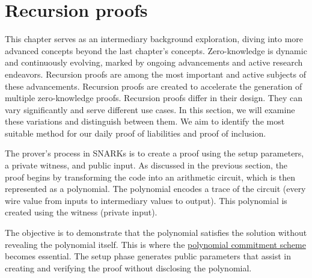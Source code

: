
\chapter{Recursion proofs}

This chapter serves as an intermediary background exploration, 
diving into more advanced concepts beyond the last chapter's concepts.
Zero-knowledge is dynamic and continuously evolving,
marked by ongoing advancements and active research endeavors. 
Recursion proofs are among the most important and active subjects of these advancements. Recursion proofs are created to accelerate
the generation of multiple zero-knowledge proofs.
Recursion proofs differ in their design. They can vary significantly and serve different use cases.
In this section, we will examine these variations and distinguish between them.
We aim to identify the most suitable method for our daily proof of liabilities and proof of inclusion. \cite{Nova23}


The prover's process in SNARKs is to create a proof using the setup parameters, a private witness, and public input. 
As discussed in the previous section, the proof begins by transforming the code into an arithmetic circuit, 
which is then represented as a polynomial. The polynomial encodes a trace of the circuit (every wire value from inputs to intermediary values to output).
This polynomial is created using the witness (private input).

The objective is to demonstrate that the polynomial satisfies the solution without revealing the polynomial itself. 
This is where the \hyperref[subsec:pc]{polynomial commitment scheme} becomes essential. 
The setup phase generates public parameters that assist in creating and verifying the proof without disclosing the polynomial.

